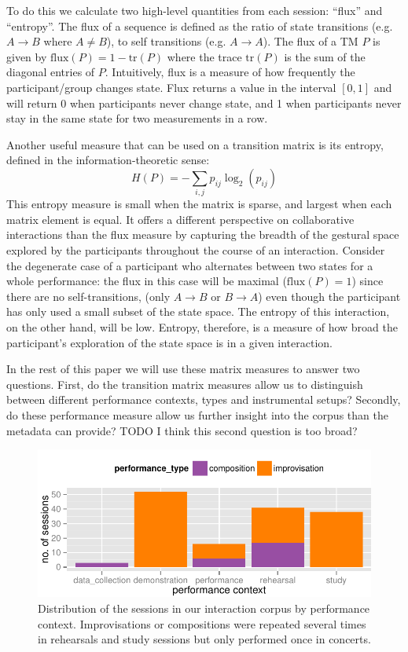 \documentclass{sigchi}
\begin{document}
To do this we calculate two high-level quantities from each session:
``flux'' and ``entropy''. The flux of a sequence is defined as the
ratio of state transitions (e.g. $A \rightarrow B$ where $A \neq B$),
to self transitions (e.g. $A \rightarrow A $). The flux of a TM $P$ is
given by $\mathrm{flux}(P) = 1 - \mathrm{tr}(P)$ where the trace
$\mathrm{tr}(P)$ is the sum of the diagonal entries of $P$.
Intuitively, flux is a measure of how frequently the participant/group
changes state. Flux returns a value in the interval $[0,1]$ and will
return 0 when participants never change state, and 1 when participants
never stay in the same state for two measurements in a row.

Another useful measure that can be used on a transition matrix is its
entropy, defined in the information-theoretic\cite{Shannon:1948rt}
sense:
\begin{equation}
  H(P) = -\sum_{i,j}p_{ij}\log_2(p_{ij})
\end{equation}
This entropy measure is small when the matrix is sparse, and largest
when each matrix element is equal. It offers a different perspective
on collaborative interactions than the flux measure by capturing the
breadth of the gestural space explored by the participants throughout
the course of an interaction. Consider the degenerate case of a
participant who alternates between two states for a whole performance:
the flux in this case will be maximal ($\mathrm{flux}(P) = 1$) since
there are no self-transitions, (only $A \rightarrow B$ or
$ B \rightarrow A$) even though the participant has only used a small
subset of the state space. The entropy of this interaction, on the
other hand, will be low. Entropy, therefore, is a measure of how broad
the participant's exploration of the state space is in a given
interaction.

In the rest of this paper we will use these matrix measures to answer
two questions. First, do the transition matrix measures allow us to
distinguish between different performance contexts, types and
instrumental setups? Secondly, do these performance measure allow us
further insight into the corpus than the metadata can provide? TODO I
think this second question is too broad?

\begin{figure}
  \centering
  \includegraphics[width=\linewidth]{figures/sessions-count}
  \caption{Distribution of the sessions in our interaction corpus by
    performance context. Improvisations or compositions were repeated
    several times in rehearsals and study sessions but only performed
    once in concerts.
    \label{fig:count-data}}
\end{figure}
\end{document}
